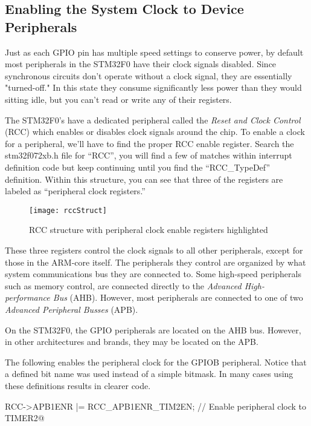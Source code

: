 \documentclass[11pt,fleqn]{book} %
\makeatletter
\newcommand{\ilcode}[1]{
    \smallskip
    \colorbox{gray!20!white}{
        \centering
        \parbox{\linewidth-2\fboxsep}{
            \lstinline@#1@
        }
    }
}
\makeatother
\begin{document}
\subsection{Enabling the System Clock to Device Peripherals}

Just as each GPIO pin has multiple speed settings to conserve power, by default most peripherals in the STM32F0 have their clock signals disabled. Since synchronous circuits don't operate without a clock signal, they are essentially "turned-off." In this state they consume significantly less power than they would sitting idle, but you can't read or write any of their registers.

The STM32F0's have a dedicated peripheral called the \textit{Reset and Clock Control} (RCC) which enables or disables clock signals around the chip. To enable a clock for a peripheral, we'll have to find the proper RCC enable register. Search the stm32f072xb.h file for ``RCC'', you will find a few of matches within interrupt definition code but keep continuing until you find the ``RCC\_TypeDef'' definition. Within this structure, you can see that three of the registers are labeled as ``peripheral clock registers.''


\begin{figure}[]
    \centering\texttt{[image: rccStruct]}
    \caption{RCC structure with peripheral clock enable registers highlighted}
    \label{rccStruct}
\end{figure}

These three registers control the clock signals to all other peripherals, except for those in the ARM-core itself. The peripherals they control are organized by what system communications bus they are connected to. Some high-speed peripherals such as memory control, are connected directly to the \textit{Advanced High-performance Bus} (AHB). However, most peripherals are connected to one of two \textit{Advanced Peripheral Busses} (APB).

On the STM32F0, the GPIO peripherals are located on the AHB bus. However, in other architectures and brands, they may be located on the APB.

\begin{example}
    The following enables the peripheral clock for the GPIOB peripheral. Notice that a defined bit name was used instead of a simple bitmask. In many cases using these definitions results in clearer code.

    \ilcode{RCC->APB1ENR |= RCC\_APB1ENR\_TIM2EN;    // Enable peripheral clock to TIMER2}
    \smallskip
\end{example}
\end{document}
